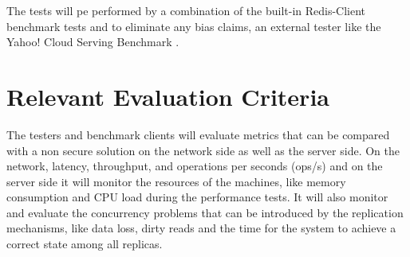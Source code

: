 The tests will pe performed by a combination of the built-in Redis-Client benchmark tests \cite{redis_benchmark_cli:1} and to eliminate any bias claims, an external tester like the Yahoo! Cloud Serving Benchmark \cite{yahoo_benchmark:1}.

\section{Relevant Evaluation Criteria} %
\label{sec:relevant_evaluation_criteria}

The testers and benchmark clients will evaluate metrics that can be compared with a non secure solution on the network side as well as the server side. On the network, latency, throughput, and operations per seconds (ops/s) and on the server side it will monitor the resources of the machines, like memory consumption and CPU load during the performance tests. It will also monitor and evaluate the concurrency problems that can be introduced by the replication mechanisms, like data loss, dirty reads and the time for the system to achieve a correct state among all replicas.
